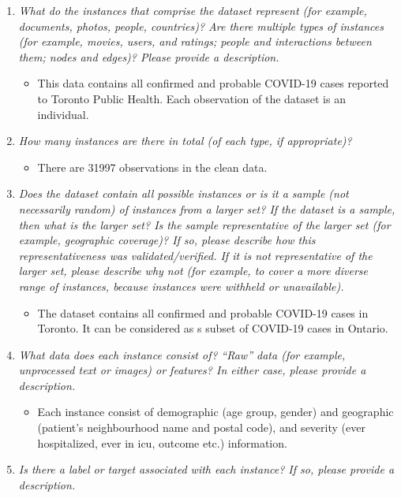 \documentclass[
]{article}
\providecommand{\tightlist}{%
  \setlength{\itemsep}{0pt}\setlength{\parskip}{0pt}}
\begin{document}
\begin{enumerate}
\def\labelenumi{\arabic{enumi}.}
\tightlist
\item
  \emph{What do the instances that comprise the dataset represent (for example, documents, photos, people, countries)? Are there multiple types of instances (for example, movies, users, and ratings; people and interactions between them; nodes and edges)? Please provide a description.}

  \begin{itemize}
  \tightlist
  \item
    This data contains all confirmed and probable COVID-19 cases reported to Toronto Public Health. Each observation of the dataset is an individual.
  \end{itemize}
\item
  \emph{How many instances are there in total (of each type, if appropriate)?}

  \begin{itemize}
  \tightlist
  \item
    There are 31997 observations in the clean data.
  \end{itemize}
\item
  \emph{Does the dataset contain all possible instances or is it a sample (not necessarily random) of instances from a larger set? If the dataset is a sample, then what is the larger set? Is the sample representative of the larger set (for example, geographic coverage)? If so, please describe how this representativeness was validated/verified. If it is not representative of the larger set, please describe why not (for example, to cover a more diverse range of instances, because instances were withheld or unavailable).}

  \begin{itemize}
  \tightlist
  \item
    The dataset contains all confirmed and probable COVID-19 cases in Toronto. It can be considered as s subset of COVID-19 cases in Ontario.
  \end{itemize}
\item
  \emph{What data does each instance consist of? ``Raw'' data (for example, unprocessed text or images) or features? In either case, please provide a description.}

  \begin{itemize}
  \tightlist
  \item
    Each instance consist of demographic (age group, gender) and geographic (patient's neighbourhood name and postal code), and severity (ever hospitalized, ever in icu, outcome etc.) information.
  \end{itemize}
\item
  \emph{Is there a label or target associated with each instance? If so, please provide a description.}


\end{enumerate}
\end{document}
